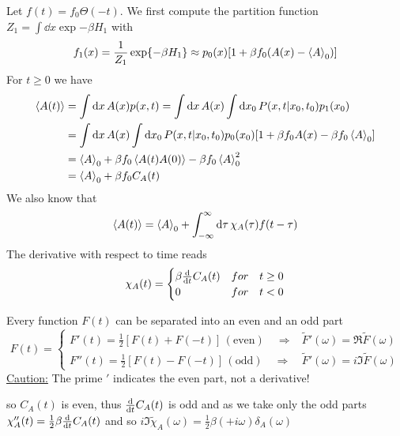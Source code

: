 \documentclass{notebook}
\begin{document}
Let $f(t) = f_0 \Theta(-t)$. We first compute the partition function $Z_1 = \int \dd{x} \exp{- \beta H_1}$ with 
%
\begin{equation}
	f_1(x) = \frac{1}{Z_1} \exp{- \beta H_1} \approx p_0(x) [1 + \beta f_0(A(x) - \expval{A}_0)]
\end{equation}
%
For $t \geq 0$ we have 
%
\begin{align*}
\expval{A(t)} &= \int \dd{x} A(x) p(x,t) = \int \dd{x} A(x) \int \dd{x_0} P(x, t | x_0, t_0) p_1(x_0) \\
&= \int \dd{x} A(x) \int \dd{x_0} P(x, t | x_0, t_0) p_0(x_0) [1 + \beta f_0 A(x) - \beta f_0  \expval{A}_0] \\
&= \expval{A}_0 + \beta f_0 \expval{A(t) A(0)} -\beta f_0 \expval{A}^2_0 \\
&= \expval{A}_0 + \beta f_0 C_A(t)
\end{align*}
%
We also know that
%
\begin{equation}
\expval{A(t)} = \expval{A}_0 + \int_{-\infty}^{\infty} \dd{\tau} \chi_A(\tau) f(t-\tau)
\end{equation}
%
The derivative with respect to time reads
%
\begin{equation*}
	\chi_A(t) = 
	\begin{cases} 
		\beta \dv{t} C_A(t) & for \quad t \geq 0 \\ 
		0 & for \quad t < 0
	\end{cases}
\end{equation*}
%

%
\begin{remark}
	Every function $F(t)$ can be separated into an even and an odd part
	\begin{equation*}
	F(t) = 
	\begin{cases} 
	F'(t) = \frac{1}{2} [F(t) + F(-t)] \, (\mathrm{even}) \quad \Rightarrow & \tilde{F}'(\omega) = \Re \tilde{F}(\omega) \\ 
	F''(t) = \frac{1}{2} [F(t) - F(-t)] \, (\mathrm{odd}) \quad \Rightarrow & \tilde{F}'(\omega) = i \Im \tilde{F}(\omega)
	\end{cases}
	\end{equation*}
	\underline{Caution:} The prime $'$ indicates the even part, not a derivative!
\end{remark}
%

so $C_A(t)$ is even, thus $\dv{t} C_A(t)$ is odd and as we take only the odd parts 
$\chi_A''(t) = \frac{1}{2} \beta \dv{t} C_A(t)$
and so $i \Im \tilde{\chi}_A(\omega) = \frac{1}{2} \beta (+ i \omega) \delta_A(\omega)$
\end{document}
